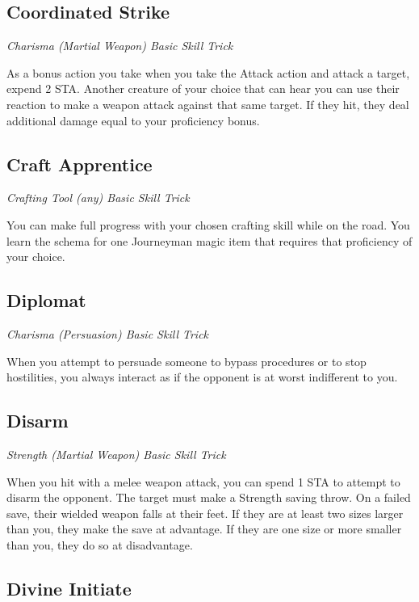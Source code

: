 \subsection{Coordinated Strike}

\textit{Charisma (Martial Weapon) Basic Skill Trick}

As a bonus action you take when you take the Attack action and attack a target, expend 2 STA. Another creature of your choice that can hear you can use their reaction to make a weapon attack against that same target. If they hit, they deal additional damage equal to your proficiency bonus.

\subsection{Craft Apprentice}\label{st:craft-apprentice}

\textit{Crafting Tool (any) Basic Skill Trick}

You can make full progress with your chosen crafting skill while on the road. You learn the schema for one Journeyman magic item that requires that proficiency of your choice.

\subsection{Diplomat}\label{st:diplomat}

\textit{Charisma (Persuasion) Basic Skill Trick}

When you attempt to persuade someone to bypass procedures or to stop hostilities, you always interact as if the opponent is at worst indifferent to you.

\subsection{Disarm}

\textit{Strength (Martial Weapon) Basic Skill Trick}

When you hit with a melee weapon attack, you can spend 1 STA to attempt to disarm the opponent. The target must make a Strength saving throw. On a failed save, their wielded weapon falls at their feet. If they are at least two sizes larger than you, they make the save at advantage. If they are one size or more smaller than you, they do so at disadvantage. 

\subsection{Divine Initiate}

